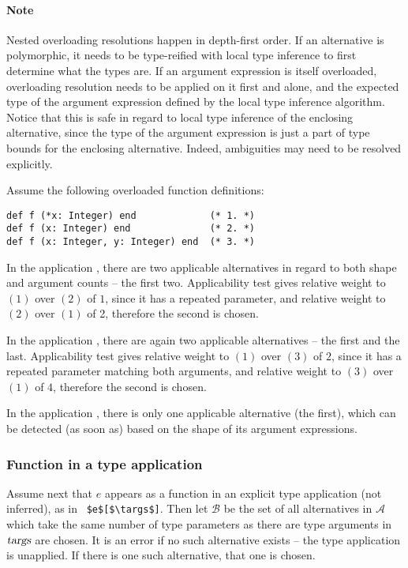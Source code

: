 \paragraph{Note}
Nested overloading resolutions happen in depth-first order. If an alternative is polymorphic, it needs to be type-reified with local type inference to first determine what the types are. If an argument expression is itself overloaded, overloading resolution needs to be applied on it first and alone, and the expected type of the argument expression defined by the local type inference algorithm. Notice that this is safe in regard to local type inference of the enclosing alternative, since the type of the argument expression is just a part of type bounds for the enclosing alternative. Indeed, ambiguities may need to be resolved explicitly. 

\example Assume the following overloaded function definitions:
\begin{lstlisting}
def f (*x: Integer) end             (* 1. *)
def f (x: Integer) end              (* 2. *)
def f (x: Integer, y: Integer) end  (* 3. *)
\end{lstlisting}

In the application , there are two applicable alternatives in regard to both shape and argument counts -- the first two. Applicability test gives relative weight to $(1)$ over $(2)$ of $1$, since it has a repeated parameter, and relative weight to $(2)$ over $(1)$ of 2, therefore the second is chosen. 

In the application , there are again two applicable alternatives -- the first and the last. Applicability test gives relative weight to $(1)$ over $(3)$ of $2$, since it has a repeated parameter matching both arguments, and relative weight to $(3)$ over $(1)$ of $4$, therefore the second is chosen. 

In the application , there is only one applicable alternative (the first), which can be detected (as soon as) based on the shape of its argument expressions. 






\subsubsection{Function in a type application}

Assume next that $e$ appears as a function in an explicit type application (not inferred), as in ~\lstinline!$e$[$\targs$]!. Then let $\mathcal{B}$ be the set of all alternatives in $\mathcal{A}$ which take the same number of type parameters as there are type arguments in $\mbox{\sl targs}$ are chosen. It is an error if no such alternative exists -- the type application is unapplied. If there is one such alternative, that one is chosen. 

